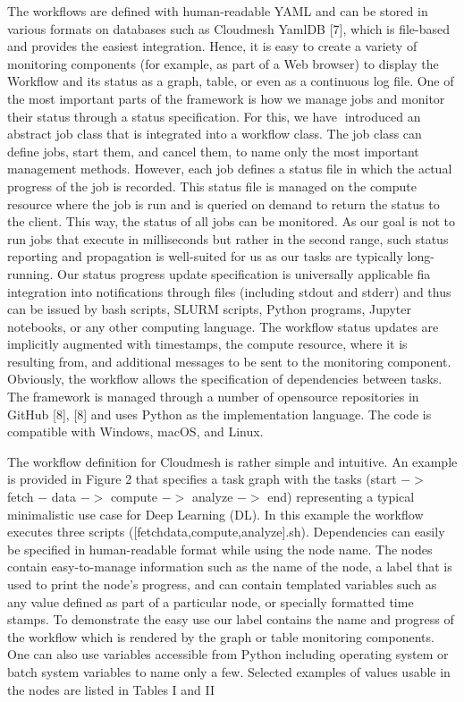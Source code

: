 \documentclass[utf8]{FrontiersinVancouver} %
\begin{document}
The workflows are defined with human-readable YAML and can be stored
in various formats on databases such as Cloudmesh YamlDB [7], which is
file-based and provides the easiest integration. Hence, it is easy to
create a variety of monitoring components (for example, as part of a
Web browser) to display the Workflow and its status as a graph, table,
or even as a continuous log file.  One of the most important parts of
the framework is how we manage jobs and monitor their status through a
status specification. For this, we have introduced an abstract job
class that is integrated into a workflow class. The job class can
define jobs, start them, and cancel them, to name only the most
important management methods. However, each job defines a status file
in which the actual progress of the job is recorded.  This status file
is managed on the compute resource where the job is run and is queried
on demand to return the status to the client. This way, the status of
all jobs can be monitored. As our goal is not to run jobs that execute
in milliseconds but rather in the second range, such status reporting
and propagation is well-suited for us as our tasks are typically
long-running.  Our status progress update specification is universally
applicable fia integration into notifications through files (including
stdout and stderr) and thus can be issued by bash scripts, SLURM
scripts, Python programs, Jupyter notebooks, or any other computing
language. The workflow status updates are implicitly augmented with
timestamps, the compute resource, where it is resulting from, and
additional messages to be sent to the monitoring component. Obviously,
the workflow allows the specification of dependencies between tasks.
The framework is managed through a number of opensource repositories
in GitHub [8], [8] and uses Python as the implementation language. The
code is compatible with Windows, macOS, and Linux.

The workflow definition for Cloudmesh is rather simple and
intuitive. An example is provided in Figure 2 that specifies a task
graph with the tasks (start $->$ fetch − data $->$ compute $->$ analyze $->$ end)
representing a typical minimalistic use case for Deep Learning
(DL). In this example the workflow executes three scripts
([fetchdata,compute,analyze].sh). Dependencies can easily be specified
in human-readable format while using the node name. The nodes contain
easy-to-manage information such as the name of the node, a label that
is used to print the node’s progress, and can contain templated
variables such as any value defined as part of a particular node, or
specially formatted time stamps.  To demonstrate the easy use our
label contains the name and progress of the workflow which is rendered
by the graph or table monitoring components. One can also use
variables accessible from Python including operating system or batch
system variables to name only a few. Selected examples of values
usable in the nodes are listed in Tables I and II
\end{document}

